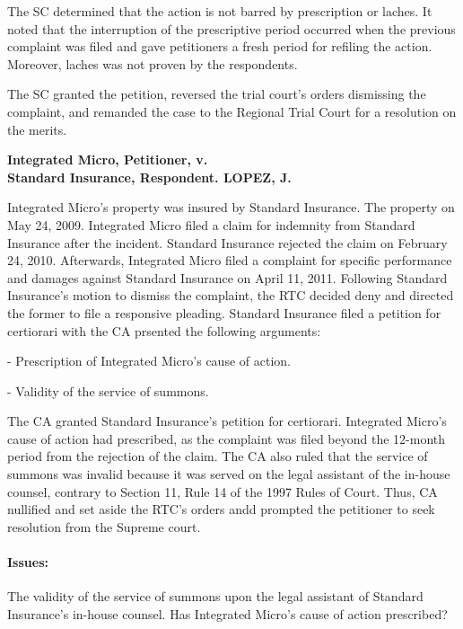 \documentclass[
12pt,
oneside,
onehalfspacing,
headsepline
]{DigestCollection}
\begin{document}
The SC determined that the action is not barred by prescription or laches. It noted that the interruption of the prescriptive period occurred when the previous complaint was filed and gave petitioners a fresh period for refiling the action. Moreover, laches was not proven by the respondents.

The SC granted the petition, reversed the trial court's orders dismissing the complaint, and remanded the case to the Regional Trial Court for a resolution on the merits.


\noindent\textbf{Integrated Micro, Petitioner, v. \\Standard Insurance, Respondent. LOPEZ, J.}\vspace{0.4cm}

Integrated Micro's property was insured by Standard Insurance. The property on May 24, 2009. Integrated Micro filed a claim for indemnity from Standard Insurance after the incident. Standard Insurance rejected the claim on February 24, 2010. Afterwards, Integrated Micro filed a complaint for specific performance and damages against Standard Insurance on April 11, 2011. Following Standard Insurance's motion to dismiss the complaint, the RTC decided deny and directed the former to file a responsive pleading. Standard Insurance filed a petition for certiorari with the CA prsented the following arguments:

- Prescription of Integrated Micro's cause of action.

- Validity of the service of summons.

The CA granted Standard Insurance's petition for certiorari. Integrated Micro's cause of action had prescribed, as the complaint was filed beyond the 12-month period from the rejection of the claim. The CA also ruled that the service of summons was invalid because it was served on the legal assistant of the in-house counsel, contrary to Section 11, Rule 14 of the 1997 Rules of Court. Thus, CA nullified and set aside the RTC's orders andd prompted the petitioner to seek resolution from the Supreme court.

\paragraph{Issues: }

The validity of the service of summons upon the legal assistant of Standard Insurance's in-house counsel. Has Integrated Micro's cause of action prescribed?
\end{document}
